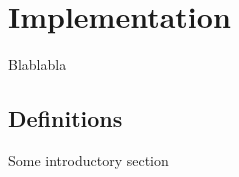 \chapter{Implementation}
\label{chapt:Implementation}
Blablabla

\section{Definitions}
Some introductory section